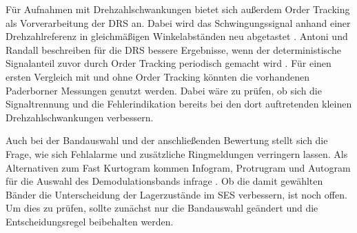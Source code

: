Für Aufnahmen mit Drehzahlschwankungen bietet sich außerdem Order Tracking
als Vorverarbeitung der DRS an.
Dabei wird das Schwingungssignal anhand einer Drehzahlreferenz in
gleichmäßigen Winkelabständen neu abgetastet
\cite[S.~188--191, Abschn.~1.2]{fyfeANALYSISCOMPUTEDORDER1997}.
Antoni und Randall beschreiben für die DRS bessere Ergebnisse, wenn der
deterministische Signalanteil zuvor durch Order Tracking periodisch
gemacht wird \cite[S.~115, Abschn.~5]{antoniUnsupervisedNoiseCancellation2004}.
Für einen ersten Vergleich mit und ohne Order Tracking könnten die
vorhandenen Paderborner Messungen genutzt werden. Dabei wäre zu prüfen,
ob sich die Signaltrennung und die Fehlerindikation bereits bei den dort
auftretenden kleinen Drehzahlschwankungen verbessern.

Auch bei der Bandauswahl und der anschließenden Bewertung stellt sich
die Frage, wie sich Fehlalarme und zusätzliche Ringmeldungen verringern
lassen.
Als Alternativen zum Fast Kurtogram kommen Infogram, Protrugram und
Autogram für die Auswahl des Demodulationsbands infrage
\cite{antoniInfogramEntropicEvidence2016,barszczNovelMethodOptimal2011,
moshrefzadehAutogramEffectiveApproach2018}.
Ob die damit gewählten Bänder die Unterscheidung der Lagerzustände im
SES verbessern, ist noch offen. Um dies zu prüfen, sollte zunächst nur
die Bandauswahl geändert und die Entscheidungsregel beibehalten werden.

